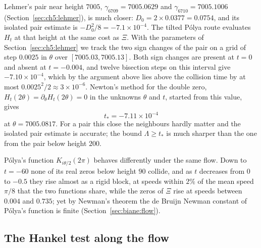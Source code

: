 Lehmer's pair near height $7005$, $\gamma_{6709}=7005.0629$ and $\gamma_{6710}=7005.1006$ (Section~\ref{sec:ch5:lehmer}), is much closer: $D_0=2\times0.0377=0.0754$, and its isolated pair estimate is $-D_0^2/8=-7.1\times10^{-4}$. The tilted P\'olya route evaluates $H_t$ at that height at the same cost as $\Xi$. With the parameters of Section~\ref{sec:ch5:lehmer} we track the two sign changes of the pair on a grid of step $0.0025$ in $\theta$ over $[7005.03,7005.13]$. Both sign changes are present at $t=0$ and absent at $t=-0.004$, and twelve bisection steps on this interval give $-7.10\times10^{-4}$, which by the argument above lies above the collision time by at most $0.0025^2/2\approx3\times10^{-6}$. Newton's method for the double zero, $H_t(2\theta)=\partial_\theta H_t(2\theta)=0$ in the unknowns $\theta$ and $t$, started from this value, gives
\[
t_*=-7.11\times10^{-4}
\]
at $\theta=7005.0817$. For a pair this close the neighbours hardly matter and the isolated pair estimate is accurate; the bound $\Lambda\ge t_*$ is much sharper than the one from the pair below height $200$.

P\'olya's function $K_{i\theta/2}(2\pi)$ behaves differently under the same flow. Down to $t=-60$ none of its real zeros below height $90$ collide, and as $t$ decreases from $0$ to $-0.5$ they rise almost as a rigid block, at speeds within $2\%$ of the mean speed $\pi/8$ that the two functions share, while the zeros of $\Xi$ rise at speeds between $0.004$ and $0.735$; yet by Newman's theorem the de Bruijn Newman constant of P\'olya's function is finite (Section~\ref{sec:biane:flow}).

\subsection{The Hankel test along the flow}\label{sec:ch21:hankel}

